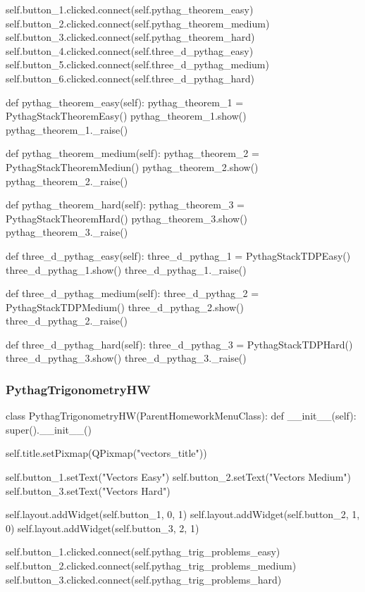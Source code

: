 \begin{landscape}
\begin{python}
        self.button_1.clicked.connect(self.pythag_theorem_easy)
        self.button_2.clicked.connect(self.pythag_theorem_medium)
        self.button_3.clicked.connect(self.pythag_theorem_hard)
        self.button_4.clicked.connect(self.three_d_pythag_easy)
        self.button_5.clicked.connect(self.three_d_pythag_medium)
        self.button_6.clicked.connect(self.three_d_pythag_hard)
    
    def pythag_theorem_easy(self):
        pythag_theorem_1 = PythagStackTheoremEasy()
        pythag_theorem_1.show()
        pythag_theorem_1._raise()

    def pythag_theorem_medium(self):
        pythag_theorem_2 = PythagStackTheoremMediun()
        pythag_theorem_2.show()
        pythag_theorem_2._raise()

    def pythag_theorem_hard(self):
        pythag_theorem_3 = PythagStackTheoremHard()
        pythag_theorem_3.show()
        pythag_theorem_3._raise()

    def three_d_pythag_easy(self):
        three_d_pythag_1 = PythagStackTDPEasy()
        three_d_pythag_1.show()
        three_d_pythag_1._raise()

    def three_d_pythag_medium(self):
        three_d_pythag_2 = PythagStackTDPMedium()
        three_d_pythag_2.show()
        three_d_pythag_2._raise()

    def three_d_pythag_hard(self):
        three_d_pythag_3 = PythagStackTDPHard()
        three_d_pythag_3.show()
        three_d_pythag_3._raise()
\end{python}

\subsubsection{PythagTrigonometryHW}

\begin{python}
class PythagTrigonometryHW(ParentHomeworkMenuClass):
    def __init__(self):
        super().__init__()

        self.title.setPixmap(QPixmap("vectors_title"))

        self.button_1.setText("Vectors Easy")
        self.button_2.setText("Vectors Medium")
        self.button_3.setText("Vectors Hard")

        self.layout.addWidget(self.button_1, 0, 1)
        self.layout.addWidget(self.button_2, 1, 0)
        self.layout.addWidget(self.button_3, 2, 1)

        self.button_1.clicked.connect(self.pythag_trig_problems_easy)
        self.button_2.clicked.connect(self.pythag_trig_problems_medium)
        self.button_3.clicked.connect(self.pythag_trig_problems_hard)
        

\end{python}
\end{landscape}
